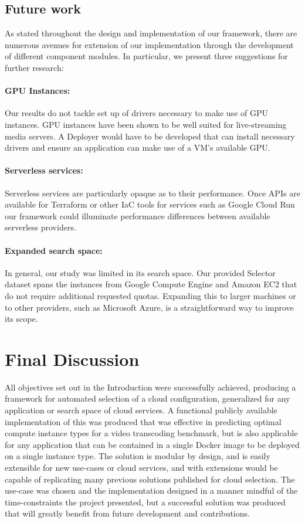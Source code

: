 \documentclass{report}
\begin{document}
\subsection{Future work}
As stated throughout the design and implementation of our framework, there are numerous avenues for extension of our implementation through the development of different component modules. In particular, we present three suggestions for further research:

\paragraph{GPU Instances:} Our results do not tackle set up of drivers necessary to make use of GPU instances. GPU instances have been shown to be well suited for live-streaming media servers\cite{Lottarini2018}. A Deployer would have to be developed that can install necessary drivers and ensure an application can make use of a VM's available GPU.
\paragraph{Serverless services:} Serverless services are particularly opaque as to their performance. Once APIs are available for Terraform or other IaC tools for services such as Google Cloud Run our framework could illuminate performance differences between available serverless providers.
\paragraph{Expanded search space:} In general, our study was limited in its search space. Our provided Selector dataset spans the instances from Google Compute Engine and Amazon EC2 that do not require additional requested quotas. Expanding this to larger machines or to other providers, such as Microsoft Azure, is a straightforward way to improve its scope. 
\section{Final Discussion}
All objectives set out in the Introduction were successfully achieved, producing a framework for automated selection of a cloud configuration, generalized for any application or search space of cloud services. A functional publicly available implementation of this was produced that was effective in predicting optimal compute instance types for a video transcoding benchmark, but is also applicable for any application that can be contained in a single Docker image to be deployed on a single instance type. The solution is modular by design, and is easily extensible for new use-cases or cloud services, and with extensions would be capable of replicating many previous solutions published for cloud selection. The use-case was chosen and the implementation designed in a manner mindful of the time-constraints the project presented, but a successful solution was produced that will greatly benefit from future development and contributions.
\newpage


\newpage
\end{document}
